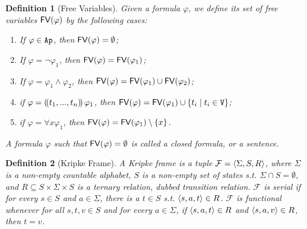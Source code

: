 \documentclass{article}
\newtheorem{definition}{Definition}
\begin{document}
\begin{definition}[Free Variables]
      Given a formula $\varphi$, we define its \emph{set of free variables} $\mathsf{FV}(\varphi)$ by the following cases: 

    \begin{enumerate}
        
        \item If $\varphi\in \texttt{Ap}$, then $\mathsf{FV}(\varphi)=\emptyset$; 
        \item If $\varphi=\neg \varphi_1$, then $\mathsf{FV}(\varphi)=\mathsf{FV}(\varphi_1)$; 
        \item If $\varphi=\varphi_1 \land \varphi_2$, then $\mathsf{FV}(\varphi)=\mathsf{FV}(\varphi_1)\cup \mathsf{FV}(\varphi_2)$; 
        \item if $\varphi=(\!( t_1,..., t_n  )\!)\,\varphi_1$, then 
       $\mathsf{FV}(\varphi)=\mathsf{FV}(\varphi_1)\cup \{t_i \mid t_i\in \texttt{V}\} $;
        
     \item if $\varphi= \forall x \varphi_1$, then $\mathsf{FV}(\varphi)=\mathsf{FV}(\varphi_1)\setminus \{x\}$.
       
        
    \end{enumerate}

    \noindent A formula $\varphi$ such that $\mathsf{FV}(\varphi)=\emptyset$ is called a \emph{closed formula}, or a \emph{sentence}. 
\end{definition}


\begin{definition}[Kripke Frame]
    A \emph{Kripke frame} is a tuple $\mathcal{F}=\langle \Sigma,S,R \rangle$, where $\Sigma$ is a non-empty countable alphabet, $S$ is a non-empty set of states  %
    s.t. $\Sigma \cap S = \emptyset$,
    and  $R\subseteq S\times \Sigma \times S$ is a ternary relation, dubbed \emph{transition relation}.  $\mathcal{F}$ is 
    \emph{serial} %
        if for every $s\in S$ and %
        $a\in \Sigma$, there is a  $t\in S$ s.t. $\langle s,a,t \rangle\in R$. $\mathcal{F}$ is \emph{functional} %
        whenever for all $s,t,v\in S$ and for every $a\in \Sigma$, if $\langle s,a,t \rangle\in R$ and $\langle s,a,v \rangle\in R$, then $t=v$. 
    
\end{definition}
\end{document}
